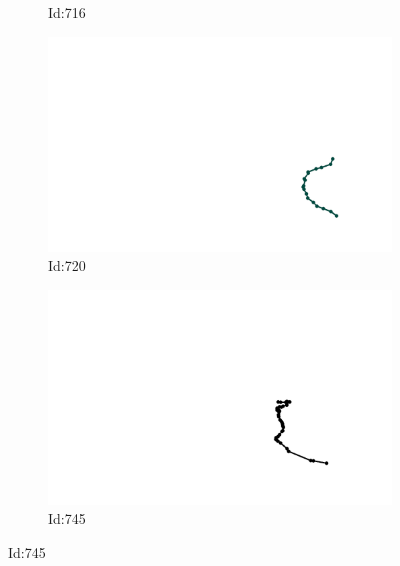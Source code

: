 \documentclass[12pt,twoside]{report}
\begin{document}
\begin{figure}
\begin{subfigure}[b]{0.20\textwidth}
\caption{Id:716}
\end{subfigure}
\begin{subfigure}[b]{0.20\textwidth}
\centering
\includegraphics[width=\textwidth]{../trajectories/720.png}
\caption{Id:720}
\end{subfigure}
\begin{subfigure}[b]{0.20\textwidth}
\centering
\includegraphics[width=\textwidth]{../trajectories/745.png}
\caption{Id:745}
\end{subfigure}
\end{figure}
\end{document}
